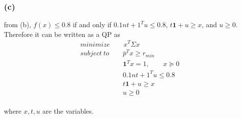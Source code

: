 \subsubsection*{(c)}
from (b), $f(x) \leq 0.8$ if and only if $0.1nt+1^Tu \leq 0.8$, $t\textbf{1}+u \geq x$, and $u \geq 0$. Therefore it can be written as a QP as
\begin{align*}
&minimize \qquad x^T\Sigma x \\
&subject\ to \qquad \bar{p}^Tx \geq r_{min}\\
&\qquad \qquad \qquad \ \textbf{1}^Tx =1, \qquad x\succeq 0\\
&\qquad \qquad \qquad \ 0.1nt+1^Tu \leq 0.8\\
&\qquad \qquad \qquad \ t\textbf{1}+u \geq x\\
&\qquad \qquad \qquad \ u \geq 0
\end{align*}
\paragraph{}
where $x,t,u$ are the variables.